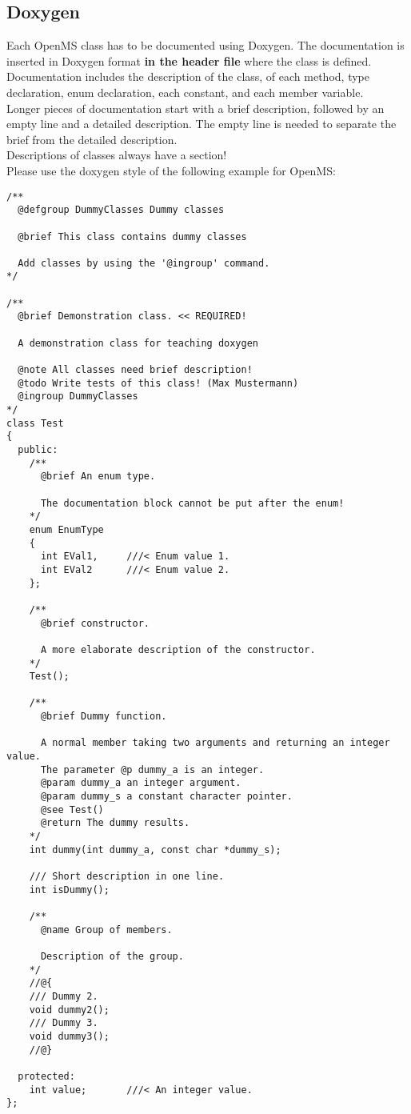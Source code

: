 \documentclass[a4]{article}
\begin{document}
\subsection{Doxygen}
Each OpenMS class has to be documented using Doxygen. The documentation is
inserted in Doxygen format \textbf{in the header file} where the class is
defined.  Documentation includes the description of the class, of each method,
type declaration, enum declaration, each constant, and each member variable.\\
Longer pieces of documentation start with a brief description, followed
by an empty line and a detailed description. The empty line is needed to separate 
the brief from the detailed description.\\
Descriptions of classes always have a \@brief section!\\
Please use the doxygen style of the following example for OpenMS:
\begin{verbatim}
/**
  @defgroup DummyClasses Dummy classes
	
  @brief This class contains dummy classes
	
  Add classes by using the '@ingroup' command. 
*/

/**
  @brief Demonstration class. << REQUIRED!
  
  A demonstration class for teaching doxygen
  
  @note All classes need brief description!
  @todo Write tests of this class! (Max Mustermann)
  @ingroup DummyClasses
*/
class Test
{
  public:
    /** 
      @brief An enum type. 
      
      The documentation block cannot be put after the enum! 
    */
    enum EnumType
    {
      int EVal1,     ///< Enum value 1.
      int EVal2      ///< Enum value 2.
    };
    
    /**
      @brief constructor.
      
      A more elaborate description of the constructor.
    */
    Test();

    /** 
      @brief Dummy function.
      
      A normal member taking two arguments and returning an integer value.
      The parameter @p dummy_a is an integer.
      @param dummy_a an integer argument.
      @param dummy_s a constant character pointer.
      @see Test()
      @return The dummy results.
    */
    int dummy(int dummy_a, const char *dummy_s);
    
    /// Short description in one line.
    int isDummy();

    /** 
      @name Group of members.
      
      Description of the group.
    */
    //@{
    /// Dummy 2.
    void dummy2();
    /// Dummy 3.
    void dummy3();
    //@}
    
  protected:
    int value;       ///< An integer value.
};
\end{verbatim}
\end{document}
